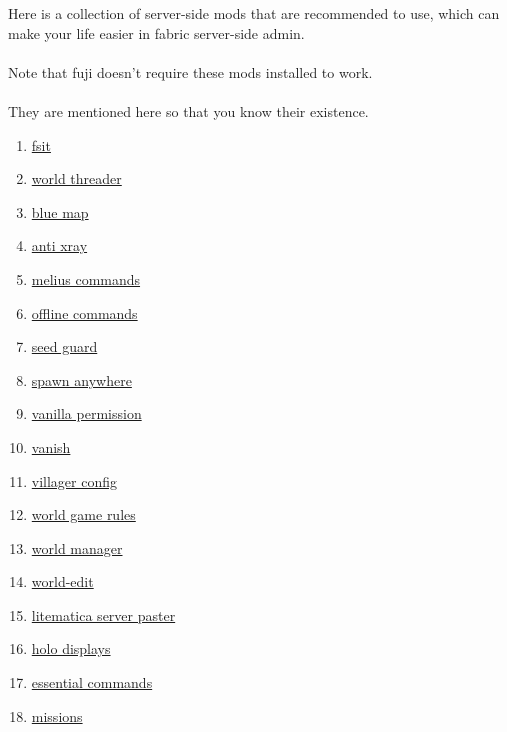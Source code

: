 \label{ch:suggestion}

Here is a collection of server-side mods that are recommended to use, which can make your life easier in fabric server-side admin.\\\\
Note that fuji doesn't require these mods installed to work. \\\\
They are mentioned here so that you know their existence.
\clearpage

\begin{enumerate}
    \item \href{https://codeberg.org/rvbsm/fsit}{fsit}
    \item \href{https://github.com/2No2Name/worldthreader}{world threader}
    \item \href{https://github.com/BlueMap-Minecraft/BlueMap}{blue map}
    \item \href{https://github.com/DrexHD/AntiXray}{anti xray}
    \item \href{https://github.com/DrexHD/MeliusCommands}{melius commands}
    \item \href{https://github.com/DrexHD/OfflineCommands}{offline commands}
    \item \href{https://github.com/DrexHD/SeedGuard}{seed guard}
    \item \href{https://github.com/DrexHD/SpawnAnywhere/}{spawn anywhere}
    \item \href{https://github.com/DrexHD/VanillaPermissions}{vanilla permission}
    \item \href{https://github.com/DrexHD/Vanish}{vanish}
    \item \href{https://github.com/DrexHD/VillagerConfig/}{villager config}
    \item \href{https://github.com/DrexHD/WorldGameRules}{world game rules}
    \item \href{https://github.com/DrexHD/WorldManager}{world manager}
    \item \href{https://github.com/EngineHub/WorldEdit/}{world-edit}
    \item \href{https://github.com/Fallen-Breath/litematica-server-paster}{litematica server paster}
    \item \href{https://github.com/Furq07/HoloDisplays}{holo displays}
    \item \href{https://github.com/John-Paul-R/Essential-Commands}{essential commands}
    \item \href{https://github.com/Kryeit/Missions}{missions}

\end{enumerate}
